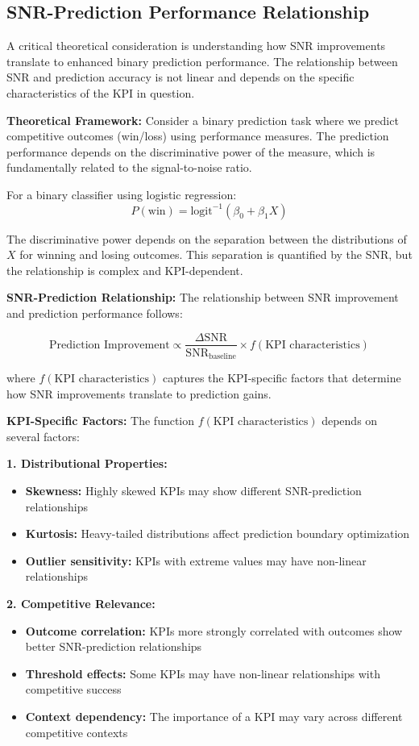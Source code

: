 \subsection{SNR-Prediction Performance Relationship}

A critical theoretical consideration is understanding how SNR improvements translate to enhanced binary prediction performance. The relationship between SNR and prediction accuracy is not linear and depends on the specific characteristics of the KPI in question.

\textbf{Theoretical Framework:}
Consider a binary prediction task where we predict competitive outcomes (win/loss) using performance measures. The prediction performance depends on the discriminative power of the measure, which is fundamentally related to the signal-to-noise ratio.

For a binary classifier using logistic regression:
$$P(\text{win}) = \text{logit}^{-1}(\beta_0 + \beta_1 X)$$

The discriminative power depends on the separation between the distributions of $X$ for winning and losing outcomes. This separation is quantified by the SNR, but the relationship is complex and KPI-dependent.

\textbf{SNR-Prediction Relationship:}
The relationship between SNR improvement and prediction performance follows:

$$\text{Prediction Improvement} \propto \frac{\Delta \text{SNR}}{\text{SNR}_{\text{baseline}}} \times f(\text{KPI characteristics})$$

where $f(\text{KPI characteristics})$ captures the KPI-specific factors that determine how SNR improvements translate to prediction gains.

\textbf{KPI-Specific Factors:}
The function $f(\text{KPI characteristics})$ depends on several factors:

\textbf{1. Distributional Properties:}
\begin{itemize}
    \item \textbf{Skewness:} Highly skewed KPIs may show different SNR-prediction relationships
    \item \textbf{Kurtosis:} Heavy-tailed distributions affect prediction boundary optimization
    \item \textbf{Outlier sensitivity:} KPIs with extreme values may have non-linear relationships
\end{itemize}

\textbf{2. Competitive Relevance:}
\begin{itemize}
    \item \textbf{Outcome correlation:} KPIs more strongly correlated with outcomes show better SNR-prediction relationships
    \item \textbf{Threshold effects:} Some KPIs may have non-linear relationships with competitive success
    \item \textbf{Context dependency:} The importance of a KPI may vary across different competitive contexts
\end{itemize}

